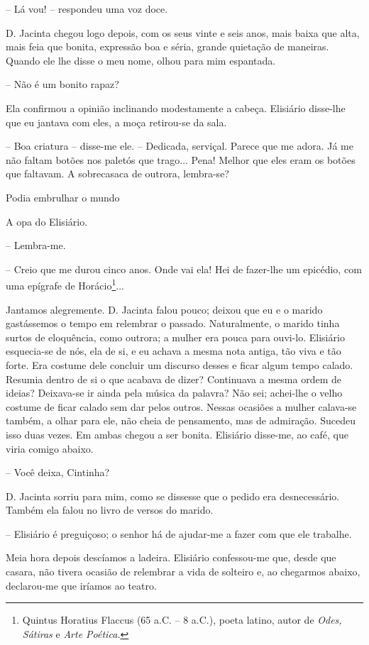 -- Lá vou! -- respondeu uma voz doce.

D. Jacinta chegou logo depois, com os seus vinte e seis anos, mais baixa
que alta, mais feia que bonita, expressão boa e séria, grande quietação
de maneiras. Quando ele lhe disse o meu nome, olhou para mim espantada.

-- Não é um bonito rapaz?

Ela confirmou a opinião inclinando modestamente a cabeça. Elisiário
disse-lhe que eu jantava com eles, a moça retirou-se da sala.

-- Boa criatura -- disse-me ele. -- Dedicada, serviçal. Parece que me
adora. Já me não faltam botões nos paletós que trago... Pena! Melhor que
eles eram os botões que faltavam. A sobrecasaca de outrora, lembra-se?

Podia embrulhar o mundo

A opa do Elisiário.

-- Lembra-me.

-- Creio que me durou cinco anos. Onde vai ela! Hei de fazer-lhe um
epicédio, com uma epígrafe de Horácio\footnote{Quintus Horatius Flaccus
  (65 a.C. -- 8 a.C.), poeta latino, autor de \emph{Odes, Sátiras} e
  \emph{Arte Poética. }}...

Jantamos alegremente. D. Jacinta falou pouco; deixou que eu e o marido
gastássemos o tempo em relembrar o passado. Naturalmente, o marido tinha
surtos de eloquência, como outrora; a mulher era pouca para ouvi-lo.
Elisiário esquecia-se de nós, ela de si, e eu achava a mesma nota
antiga, tão viva e tão forte. Era costume dele concluir um discurso
desses e ficar algum tempo calado. Resumia dentro de si o que acabava de
dizer? Continuava a mesma ordem de ideias? Deixava-se ir ainda pela
música da palavra? Não sei; achei-lhe o velho costume de ficar calado
sem dar pelos outros. Nessas ocasiões a mulher calava-se também, a olhar
para ele, não cheia de pensamento, mas de admiração. Sucedeu isso duas
vezes. Em ambas chegou a ser bonita. Elisiário disse-me, ao café, que
viria comigo abaixo.

-- Você deixa, Cintinha?

D. Jacinta sorriu para mim, como se dissesse que o pedido era
desnecessário. Também ela falou no livro de versos do marido.

-- Elisiário é preguiçoso; o senhor há de ajudar-me a fazer com que ele
trabalhe.

Meia hora depois descíamos a ladeira. Elisiário confessou-me que, desde
que casara, não tivera ocasião de relembrar a vida de solteiro e, ao
chegarmos abaixo, declarou-me que iríamos ao teatro.

